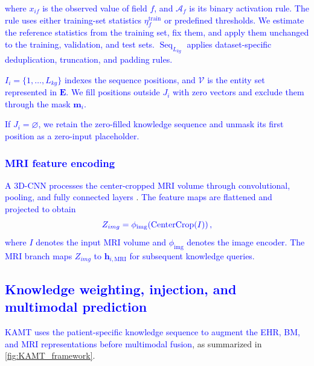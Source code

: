 \documentclass[lettersize,journal]{IEEEtran}
\begin{document}
\textcolor{blue}{where $x_{if}$ is the observed value of field $f$, and $\mathcal{A}_f$ is its binary activation rule. The rule uses either training-set statistics $\eta_f^{\mathrm{train}}$ or predefined thresholds. We estimate the reference statistics from the training set, fix them, and apply them unchanged to the training, validation, and test sets. $\operatorname{Seq}_{L_{kg}}$ applies dataset-specific deduplication, truncation, and padding rules.}

\textcolor{blue}{$I_i=\{1,\ldots,L_{kg}\}$ indexes the sequence positions, and $\mathcal{V}$ is the entity set represented in $\mathbf{E}$. We fill positions outside $J_i$ with zero vectors and exclude them through the mask $\mathbf{m}_i$.}

\textcolor{blue}{If $J_i=\varnothing$, we retain the zero-filled knowledge sequence and unmask its first position as a zero-input placeholder.}


\subsubsection{\textcolor{blue}{MRI feature encoding}}

     \textcolor{blue}{A 3D-CNN processes the center-cropped MRI volume through convolutional, pooling, and fully connected layers} \cite{wen2020convolutional,tran2015c3d}. \textcolor{blue}{The feature maps are flattened and projected to obtain}
     \begin{equation}
     {\color{blue}Z_{img} = \phi_{\mathrm{img}}\!\left(\operatorname{CenterCrop}(I)\right),}
     \label{eq:mri_projection}
     \end{equation}
     \textcolor{blue}{where $I$ denotes the input MRI volume and $\phi_{\mathrm{img}}$ denotes the image encoder. The MRI branch maps $Z_{img}$ to $\mathbf h_{i,\mathrm{MRI}}$ for subsequent knowledge queries.}

\subsection{\textcolor{blue}{Knowledge weighting, injection, and multimodal prediction}}

    \textcolor{blue}{KAMT uses the patient-specific knowledge sequence to augment the EHR, BM, and MRI representations before multimodal fusion}, as summarized in \cref{fig:KAMT_framework}.
\end{document}
